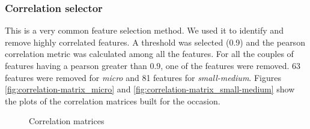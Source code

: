 \documentclass[LaM,binding=0.6cm, english]{sapthesis}
\begin{document}
\subsubsection{Correlation selector}

This is a very common feature selection method. We used it to identify and remove highly correlated features. A threshold was selected (0.9) and the pearson correlation metric was calculated among all the features. For all the couples of features having a pearson greater than 0.9, one of the features were removed. 63 features were removed for \textit{micro} and 81 features for \textit{small-medium}. Figures \ref{fig:correlation-matrix_micro} and \ref{fig:correlation-matrix_small-medium} show the plots of the correlation matrices built for the occasion.

\begin{figure}[!ht]
  \centering
  \hfill
  \caption{Correlation matrices}
\end{figure}
\end{document}
